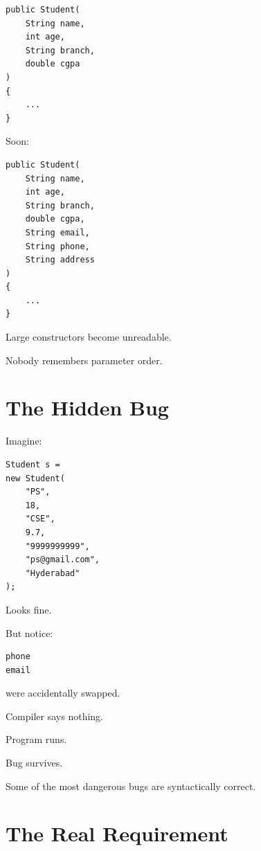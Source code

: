 \documentclass[11pt,a4paper]{book}
\begin{document}
\begin{verbatim}
public Student(
    String name,
    int age,
    String branch,
    double cgpa
)
{
    ...
}
\end{verbatim}

Soon:

\begin{verbatim}
public Student(
    String name,
    int age,
    String branch,
    double cgpa,
    String email,
    String phone,
    String address
)
{
    ...
}
\end{verbatim}

\begin{trap}

Large constructors become unreadable.

Nobody remembers parameter order.

\end{trap}


\section{The Hidden Bug}

Imagine:

\begin{verbatim}
Student s =
new Student(
    "PS",
    18,
    "CSE",
    9.7,
    "9999999999",
    "ps@gmail.com",
    "Hyderabad"
);
\end{verbatim}

Looks fine.

But notice:

\begin{verbatim}
phone
email
\end{verbatim}

were accidentally swapped.

Compiler says nothing.

Program runs.

Bug survives.

\begin{rosettarule}

Some of the most dangerous bugs are
syntactically correct.

\end{rosettarule}


\section{The Real Requirement}
\end{document}
